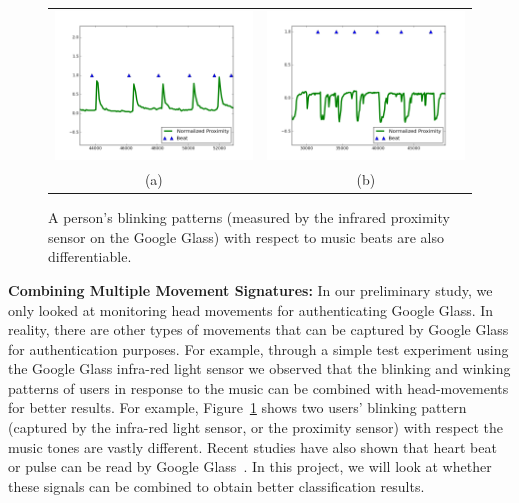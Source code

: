 \begin{figure}\centering
\vspace{-12pt}
\begin{tabular}{cc}
\includegraphics[width=0.50\linewidth]{../figure/sub1_blink_beat} &
\includegraphics[width=0.50\linewidth]{../figure/sub2_blink_beat} \\
(a) & (b)\\
\end{tabular}
    \caption{\label{fig:blink} A person's blinking patterns (measured by the infrared proximity sensor on the Google Glass) with respect to music beats are also differentiable.}
\vspace{-12pt}
\end{figure}
\vspace{4pt}\textbf{Combining Multiple Movement Signatures:} In our preliminary study, we only looked at monitoring head movements for authenticating Google Glass. In reality, there are other types of movements that can be captured by Google Glass for authentication purposes. For example, through a simple test experiment using the Google Glass
infra-red light sensor we observed that the blinking and winking patterns of users in
response to the music can be combined with head-movements for better results. For example, Figure~\ref{fig:blink} shows two users' blinking pattern (captured by the infra-red light sensor, or the proximity sensor) with respect the music tones are vastly different. Recent studies have also shown that heart beat or pulse can be read by Google Glass~\cite{hernandezbioglass}. In this project, we will look at whether these signals can be combined to obtain better classification results.

